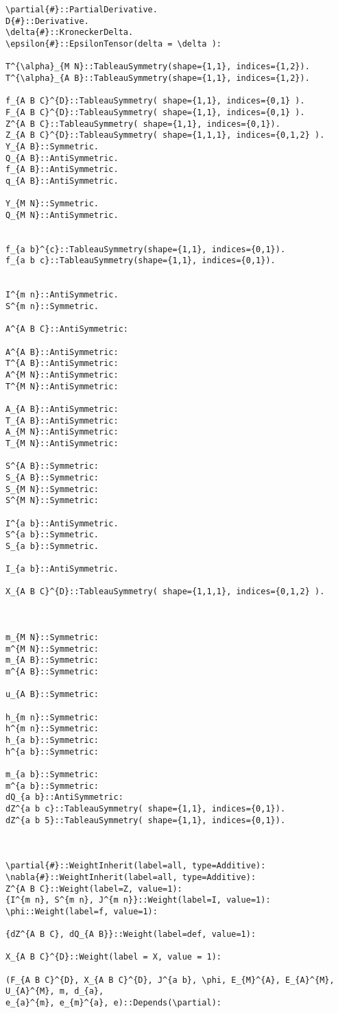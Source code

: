 \documentclass[11pt]{article}
\begin{document}
{\color[named]{Blue}\begin{verbatim}
\partial{#}::PartialDerivative.
D{#}::Derivative.
\delta{#}::KroneckerDelta.
\epsilon{#}::EpsilonTensor(delta = \delta ):

T^{\alpha}_{M N}::TableauSymmetry(shape={1,1}, indices={1,2}).
T^{\alpha}_{A B}::TableauSymmetry(shape={1,1}, indices={1,2}).

f_{A B C}^{D}::TableauSymmetry( shape={1,1}, indices={0,1} ).  
F_{A B C}^{D}::TableauSymmetry( shape={1,1}, indices={0,1} ).  
Z^{A B C}::TableauSymmetry( shape={1,1}, indices={0,1}). 
Z_{A B C}^{D}::TableauSymmetry( shape={1,1,1}, indices={0,1,2} ).  
Y_{A B}::Symmetric.
Q_{A B}::AntiSymmetric.
f_{A B}::AntiSymmetric.
q_{A B}::AntiSymmetric.

Y_{M N}::Symmetric.
Q_{M N}::AntiSymmetric.


f_{a b}^{c}::TableauSymmetry(shape={1,1}, indices={0,1}).
f_{a b c}::TableauSymmetry(shape={1,1}, indices={0,1}).


I^{m n}::AntiSymmetric.
S^{m n}::Symmetric.

A^{A B C}::AntiSymmetric:

A^{A B}::AntiSymmetric:
T^{A B}::AntiSymmetric:
A^{M N}::AntiSymmetric:
T^{M N}::AntiSymmetric:

A_{A B}::AntiSymmetric:
T_{A B}::AntiSymmetric:
A_{M N}::AntiSymmetric:
T_{M N}::AntiSymmetric:

S^{A B}::Symmetric:
S_{A B}::Symmetric:
S_{M N}::Symmetric:
S^{M N}::Symmetric:

I^{a b}::AntiSymmetric.
S^{a b}::Symmetric.
S_{a b}::Symmetric.

I_{a b}::AntiSymmetric.

X_{A B C}^{D}::TableauSymmetry( shape={1,1,1}, indices={0,1,2} ).  



m_{M N}::Symmetric:
m^{M N}::Symmetric:
m_{A B}::Symmetric:
m^{A B}::Symmetric:

u_{A B}::Symmetric:

h_{m n}::Symmetric:
h^{m n}::Symmetric:
h_{a b}::Symmetric:
h^{a b}::Symmetric:

m_{a b}::Symmetric:
m^{a b}::Symmetric:
dQ_{a b}::AntiSymmetric:
dZ^{a b c}::TableauSymmetry( shape={1,1}, indices={0,1}). 
dZ^{a b 5}::TableauSymmetry( shape={1,1}, indices={0,1}). 



\partial{#}::WeightInherit(label=all, type=Additive):
\nabla{#}::WeightInherit(label=all, type=Additive):
Z^{A B C}::Weight(label=Z, value=1):
{I^{m n}, S^{m n}, J^{m n}}::Weight(label=I, value=1):
\phi::Weight(label=f, value=1):

{dZ^{A B C}, dQ_{A B}}::Weight(label=def, value=1):

X_{A B C}^{D}::Weight(label = X, value = 1):

(F_{A B C}^{D}, X_{A B C}^{D}, J^{a b}, \phi, E_{M}^{A}, E_{A}^{M}, U_{A}^{M}, m, d_{a},
e_{a}^{m}, e_{m}^{a}, e)::Depends(\partial):
\end{verbatim}}
\end{document}
